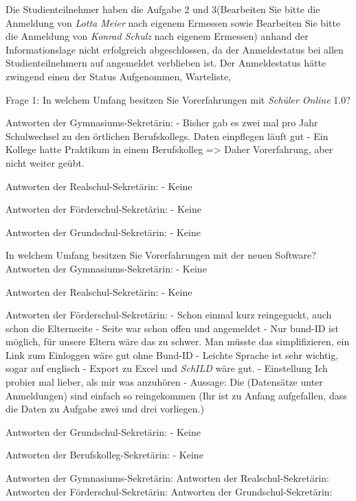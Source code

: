 Die Studienteilnehmer haben die Aufgabe 2 und 3(\glqq Bearbeiten Sie bitte die Anmeldung von \textit{Lotta Meier} nach eigenem Ermessen\grqq{} sowie \glqq Bearbeiten Sie bitte die Anmeldung von \textit{Konrad Schulz} nach eigenem Ermessen\grqq{}) anhand der Informationslage nicht erfolgreich abgeschlossen, da der Anmeldestatus bei allen Studienteilnehmern auf \glqq angemeldet\grqq{} verblieben ist. Der Anmeldestatus hätte zwingend einen der Status \glqq Aufgenommen\grqq{}, \glqq Warteliste\grqq{},\grqq{}\glqq 



Frage 1: In welchem Umfang besitzen Sie Vorerfahrungen mit \textit{Schüler Online} 1.0? 	

Antworten der Gymnasiums-Sekretärin:
- Bisher gab es zwei mal pro Jahr Schulwechsel zu den örtlichen Berufskollegs. Daten einpflegen läuft gut
- Ein Kollege hatte Praktikum in einem Berufskolleg => Daher Vorerfahrung, aber nicht weiter geübt.

Antworten der Realschul-Sekretärin:
- Keine	

Antworten der Förderschul-Sekretärin:
- Keine

Antworten der Grundschul-Sekretärin:
- Keine


In welchem Umfang besitzen Sie Vorerfahrungen mit der neuen Software?		
Antworten der Gymnasiums-Sekretärin:
- Keine				

Antworten der Realschul-Sekretärin:
- Keine				

Antworten der Förderschul-Sekretärin:
- Schon einmal kurz reingeguckt, auch schon die Elternseite
- Seite war schon offen und angemeldet	
- Nur bund-ID ist möglich, für unsere Eltern wäre das zu schwer. Man müsste das simplifizieren, ein Link zum Einloggen wäre gut ohne Bund-ID
- Leichte Sprache ist sehr wichtig, sogar auf englisch
- Export zu Excel und \textit{SchILD} wäre gut.
- Einstellung \glqq Ich probier mal lieber, als mir was anzuhören\grqq{}
- Aussage: \glqq Die (Datensätze unter Anmeldungen) sind einfach so reingekommen\grqq{} (Ihr ist zu Anfang aufgefallen, dass die Daten zu Aufgabe zwei und drei vorliegen.)			

Antworten der Grundschul-Sekretärin:
- Keine		

Antworten der Berufskolleg-Sekretärin:
- Keine				







Antworten der Gymnasiums-Sekretärin:
Antworten der Realschul-Sekretärin:
Antworten der Förderschul-Sekretärin:
Antworten der Grundschul-Sekretärin: